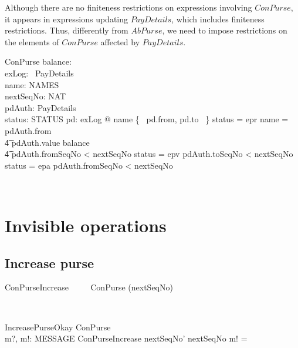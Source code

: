 Although there are no finiteness restrictions
on expressions involving $ConPurse$, it appears in expressions
updating $PayDetails$, which includes finiteness restrictions.
Thus, differently from $AbPurse$, we need to impose restrictions
on the elements of $ConPurse$ affected by $PayDetails$.
%
\begin{LSDef}
\begin{schema}{ConPurse}
   balance: \nat \\
   exLog: \power~PayDetails \\
   name: NAMES \\
   nextSeqNo: NAT \\
   pdAuth: PayDetails \\
   status: STATUS
\where
   \forall pd: exLog @ name \in \{~ pd.from, pd.to ~\}
   \also
   status = epr \implies name = pdAuth.from \\
                \t4 \land pdAuth.value \leq balance \\
                \t4 \land pdAuth.fromSeqNo < nextSeqNo
   \also
   status = epv \implies pdAuth.toSeqNo < nextSeqNo
   \also
   status = epa \implies pdAuth.fromSeqNo < nextSeqNo
\end{schema}~\end{LSDef}

\section{Invisible operations}

\subsection{Increase purse}

\begin{LSDef}
\begin{zed}
   ConPurseIncrease ~~~~ ConPurse \hide (nextSeqNo)
\end{zed}~\end{LSDef}

\begin{LSDef}
\begin{schema}{IncreasePurseOkay}
   \Delta ConPurse \\
   m?, m!: MESSAGE
\where
  \Xi ConPurseIncrease
  \also
  nextSeqNo' \geq nextSeqNo
  \also
  m! = \bot
\end{schema}~\end{LSDef}

